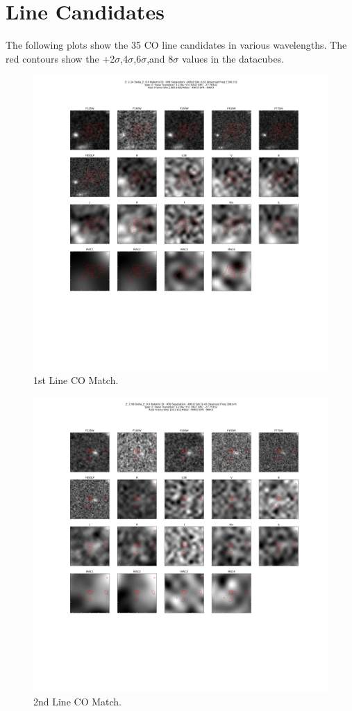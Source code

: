 \section{Line Candidates}\label{sec:A1}

The following plots show the 35 CO line candidates in various wavelengths. The red contours show the  +2$\sigma$,4$\sigma$,6$\sigma$,and 8$\sigma$ values in the datacubes. 

\begin{figure}[tbp]
\centering \includegraphics[width=120mm]{Matched/ASPECS_Cutout_0.png}
\caption{1st Line CO Match.}
\label{fig:Match_One}
\end{figure}

\begin{figure}[tbp]
\centering \includegraphics[width=120mm]{Matched/ASPECS_Cutout_1.png}
\caption{2nd Line CO Match.}
\label{fig:Match_Two}
\end{figure}

